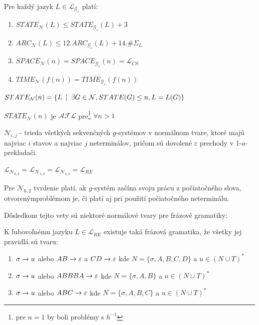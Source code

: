 \begin{dosledok}
  Pre každý jazyk $L\in\mathcal{L}_{\mathcal{G}_{\varepsilon}}$
  platí:
  \begin{enumerate}
    \item $STATE_{\mathcal{N}}(L)\leq STATE_{\mathcal{G}_{\mathcal{\varepsilon}}}(L)+3$
    \item $ARC_{\mathcal{N}}(L)\leq 12.ARC_{\mathcal{G}_{\varepsilon}}(L)+14.\#\Sigma_L$
    \item $SPACE_{\mathcal{N}}(n)=SPACE_{\mathcal{G}_{\varepsilon}}(n)=\mathcal{L}_{CS}$
    \item $TIME_{\mathcal{N}}(f(n))=TIME_{\mathcal{G}_{\varepsilon}}(f(n))$
  \end{enumerate}
\end{dosledok}

\begin{oznacenie}
  $STATE_{\mathcal{N}}(n)=\{ L\enspace |\enspace\exists G\in\mathcal{N}, STATE(G)\leq n, L=L(G)\}$
\end{oznacenie}

\begin{veta}
  $STATE_{\mathcal{N}}(n)$ je $\mathcal{AFL}$ pre\footnote{pre $n=1$ by boli problémy s
  $h^{-1}$} $\forall n>1$
\end{veta}

\begin{oznacenie}
  $\mathcal{N}_{i,j}$ - trieda všetkých sekvenčných $g$-systémov v
  normálnom tvare, ktoré majú najviac $i$ stavov a najviac $j$
  neterminálov, pričom sú dovolené $\varepsilon$ prechody v
  1-$a$-prekladači.
\end{oznacenie}

\pagebreak

\begin{veta}
  $\mathcal{L}_{\mathcal{N}_{6,2}}=\mathcal{L}_{\mathcal{N}_{5,3}}=\mathcal{L}_{\mathcal{N}_{4,4}}=\mathcal{L}_{RE}$
\end{veta}

Pre $\mathcal{N}_{6,2}$ tvrdenie platí, ak $g$-systém začína svoju
prácu z počiatočného slova, otvoreným\linebreak problémom je, či
platí aj pri použití počiatočného neterminálu.

\medskip
Dôsledkom tejto vety sú niektoré normálové tvary pre frázové
gramatiky:

\begin{dosledok}
  K ľubovoľnému jazyku $L\in\mathcal{L}_{RE}$ existuje taká frázová
  gramatika, že všetky jej pravidlá sú tvaru:
  \begin{enumerate}
    \item $\sigma\rightarrow u$ alebo $AB\rightarrow\varepsilon$ a $CD\rightarrow\varepsilon$ kde $N=\{\sigma
    ,A,B,C,D\}$ a $u\in (N\cup T)^*$
    \item $\sigma\rightarrow u$ alebo $ABBBA\rightarrow\varepsilon$ kde $N=\{\sigma ,A,B\}$ a $u\in (N\cup T)^*$
    \item $\sigma\rightarrow u$ alebo $ABC\rightarrow\varepsilon$ kde $N=\{\sigma ,A,B,C\}$ a $u\in (N\cup T)^*$
  \end{enumerate}
\end{dosledok}

